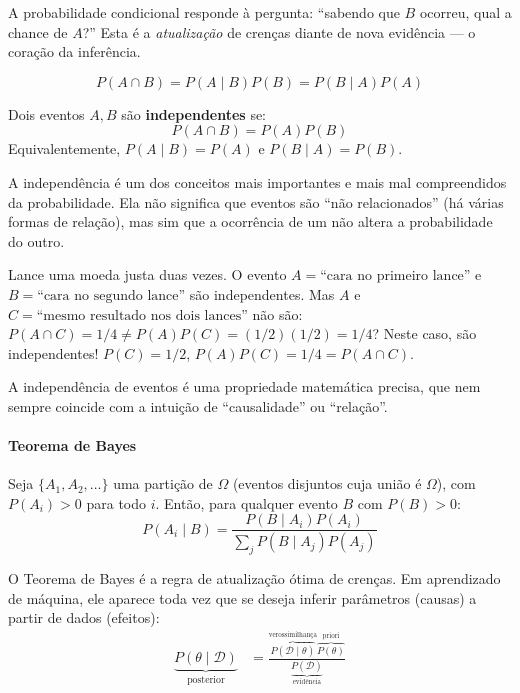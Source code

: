 \documentclass{tufte-handout}
\begin{document}
A probabilidade condicional responde à pergunta: ``sabendo que $B$ ocorreu, qual a chance de $A$?''
Esta é a {\it atualização} de crenças diante de nova evidência --- o coração da inferência.

\begin{prop}
    \[
    P(A \cap B) = P(A \mid B) P(B) = P(B \mid A) P(A)
    \]
\end{prop}

\begin{defn}[Independência]
    Dois eventos $A, B$ são \textbf{independentes} se:
    \[
    P(A \cap B) = P(A) P(B)
    \]
    Equivalentemente, $P(A \mid B) = P(A)$ e $P(B \mid A) = P(B)$.
\end{defn}

A independência é um dos conceitos mais importantes e mais mal compreendidos da probabilidade.
Ela não significa que eventos são ``não relacionados'' (há várias formas de relação), mas
sim que a ocorrência de um não altera a probabilidade do outro.

\begin{exmp}
    Lance uma moeda justa duas vezes. O evento $A = \text{``cara no primeiro lance''}$ e
    $B = \text{``cara no segundo lance''}$ são independentes. Mas $A$ e $C = \text{``mesmo
    resultado nos dois lances''}$ não são: $P(A \cap C) = 1/4 \neq P(A)P(C) = (1/2)(1/2) = 1/4$?
    Neste caso, são independentes! $P(C) = 1/2$, $P(A)P(C) = 1/4 = P(A \cap C)$.
\end{exmp}

A independência de eventos é uma propriedade matemática precisa, que nem sempre coincide
com a intuição de ``causalidade'' ou ``relação''.

\paragraph{Teorema de Bayes}

\begin{thm}[Bayes]
    Seja $\{A_1, A_2, \dots\}$ uma partição de $\Omega$ (eventos disjuntos cuja união é $\Omega$),
    com $P(A_i) > 0$ para todo $i$. Então, para qualquer evento $B$ com $P(B) > 0$:
    \[
    P(A_i \mid B) = \frac{P(B \mid A_i) P(A_i)}{\sum_j P(B \mid A_j) P(A_j)}
    \]
\end{thm}

O Teorema de Bayes é a regra de atualização ótima de crenças. Em aprendizado de máquina,
ele aparece toda vez que se deseja inferir parâmetros (causas) a partir de dados (efeitos):
\begin{align*}
    \underbrace{P(\theta \mid \mathcal{D})}_{\text{posterior}} &=
    \frac{\overbrace{P(\mathcal{D} \mid \theta)}^{\text{verossimilhança}} \overbrace{P(\theta)}^{\text{priori}}}
    {\underbrace{P(\mathcal{D})}_{\text{evidência}}}
\end{align*}
\end{document}

